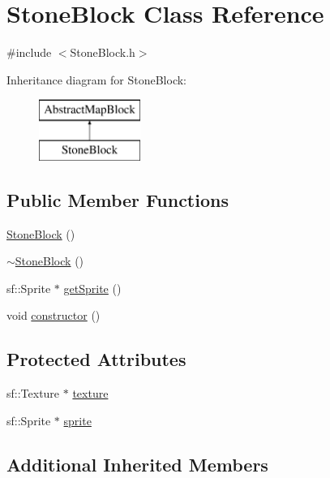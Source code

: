 \hypertarget{class_stone_block}{}\section{Stone\+Block Class Reference}
\label{class_stone_block}


{\ttfamily \#include $<$Stone\+Block.\+h$>$}

Inheritance diagram for Stone\+Block\+:\begin{figure}[H]
\begin{center}
\leavevmode
\includegraphics[height=2.000000cm]{class_stone_block}
\end{center}
\end{figure}
\subsection*{Public Member Functions}
\begin{DoxyCompactItemize}
\item 
\hyperlink{class_stone_block_ac1118014793321dd453371c33f26aa0f}{Stone\+Block} ()
\item 
\hyperlink{class_stone_block_a7a44a5fbed028ac94c49c40646477a03}{$\sim$\+Stone\+Block} ()
\item 
sf\+::\+Sprite $\ast$ \hyperlink{class_stone_block_aa2e4adb1d50d9f326ffe427bcdd6d7bb}{get\+Sprite} ()
\item 
void \hyperlink{class_stone_block_a391e99e613d1864c93647f60c9455a74}{constructor} ()
\end{DoxyCompactItemize}
\subsection*{Protected Attributes}
\begin{DoxyCompactItemize}
\item 
sf\+::\+Texture $\ast$ \hyperlink{class_stone_block_a86062896e0fedaad3bedbbd52641f76b}{texture}
\item 
sf\+::\+Sprite $\ast$ \hyperlink{class_stone_block_a1d66339d3e42126e72130dd6863d30b5}{sprite}
\end{DoxyCompactItemize}
\subsection*{Additional Inherited Members}



